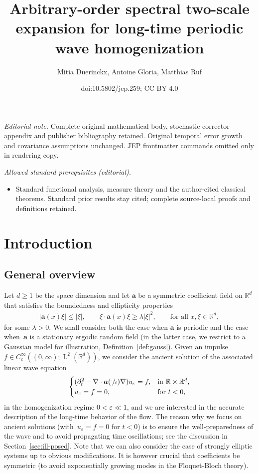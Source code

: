 \documentclass[10pt]{amsart}
\title{Arbitrary-order spectral two-scale expansion for long-time periodic wave homogenization}
\author{Mitia Duerinckx, Antoine Gloria, Matthias Ruf}
\date{doi:10.5802/jep.259; CC BY 4.0}
\theoremstyle{plain}
\theoremstyle{definition}
\numberwithin{equation}{section}
\newcommand{\e}{\varepsilon}
\newcommand{\R}{\mathbb R}
\newcommand{\Aa}{\boldsymbol a}
\newcommand{\Ld}{\operatorname{L}}
\begin{document}
\maketitle
\noindent\textit{Editorial note.} Complete original mathematical body, stochastic-corrector appendix and publisher bibliography retained. Original temporal error growth and covariance assumptions unchanged. JEP frontmatter commands omitted only in rendering copy.\par\medskip
\noindent\textit{Allowed standard prerequisites (editorial).}\begin{itemize}
\item Standard functional analysis, measure theory and the author-cited classical theorems. Standard prior results stay cited; complete source-local proofs and definitions retained.
\end{itemize}\medskip
\vspace*{-\baselineskip}
\tableofcontents


\section{Introduction}

\subsection{General overview}
Let $d\ge1$ be the space dimension and let $\Aa$ be a symmetric coefficient field on $\R^d$ that satisfies the boundedness and ellipticity properties
\begin{align}\label{eq:unif-ell}
|\Aa(x)\xi|\le|\xi|,\qquad\xi\cdot\Aa(x)\xi\ge\lambda|\xi|^2,\qquad\text{for all $x,\xi\in\R^d$},
\end{align}
for some $\lambda>0$.
We shall consider both the case when $\Aa$ is periodic and the case when~$\Aa$ is a stationary ergodic random field (in the latter case, we restrict to a Gaussian model for illustration, \cf Definition~\ref{def:gauss}).
Given an impulse
$f\in C^\infty_c((0,\infty);\Ld^2(\R^d))$,
we consider the ancient solution of the associated linear wave equation
\begin{equation}\label{eq:hyperb}
\begin{cases}
(\partial_t^2-\nabla\cdot\Aa(\sfrac\cdot\e)\nabla)u_\e=f,&\text{in $\R\times\R^d$},\\
u_\e=f=0,&\text{for $t<0$,}
\end{cases}
\end{equation}
in the homogenization regime $0<\e \ll 1$, and we are interested in the accurate description of the long-time behavior of the flow. The reason why we focus on ancient solutions (with~$u_\e=f=0$ for $t<0$) is to ensure the well-preparedness of the wave and to avoid propagating time oscillations; see {the} discussion in Section~\ref{sec:ill-posed}.
{Note that we can also consider the case of strongly elliptic systems up to obvious modifications. It is however crucial that coefficients be symmetric (to avoid exponentially growing modes in the Floquet-Bloch theory).}
\end{document}
